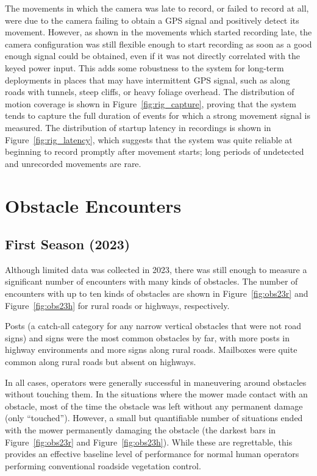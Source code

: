\documentclass[
]{article}
\begin{document}
The movements in which the camera was late to record, or failed to
record at all, were due to the camera failing to obtain a GPS signal and
positively detect its movement. However, as shown in the movements which
started recording late, the camera configuration was still flexible
enough to start recording as soon as a good enough signal could be
obtained, even if it was not directly correlated with the keyed power
input. This adds some robustness to the system for long-term deployments
in places that may have intermittent GPS signal, such as along roads
with tunnels, steep cliffs, or heavy foliage overhead. The distribution
of motion coverage is shown in Figure~\ref{fig:rig_capture}, proving
that the system tends to capture the full duration of events for which a
strong movement signal is measured. The distribution of startup latency
in recordings is shown in Figure~\ref{fig:rig_latency}, which suggests
that the system was quite reliable at beginning to record promptly after
movement starts; long periods of undetected and unrecorded movements are
rare.

\section{Obstacle Encounters}\label{sec:obstacles}

\subsection{First Season (2023)}\label{first-season-2023}

Although limited data was collected in 2023, there was still enough to
measure a significant number of encounters with many kinds of obstacles.
The number of encounters with up to ten kinds of obstacles are shown in
Figure~\ref{fig:obs23r} and Figure~\ref{fig:obs23h} for rural roads or
highways, respectively.

Posts (a catch-all category for any narrow vertical obstacles that were
not road signs) and signs were the most common obstacles by far, with
more posts in highway environments and more signs along rural roads.
Mailboxes were quite common along rural roads but absent on highways.

In all cases, operators were generally successful in maneuvering around
obstacles without touching them. In the situations where the mower made
contact with an obstacle, most of the time the obstacle was left without
any permanent damage (only ``touched''). However, a small but
quantifiable number of situations ended with the mower permanently
damaging the obstacle (the darkest bars in Figure~\ref{fig:obs23r} and
Figure~\ref{fig:obs23h}). While these are regrettable, this provides an
effective baseline level of performance for normal human operators
performing conventional roadside vegetation control.
\end{document}
